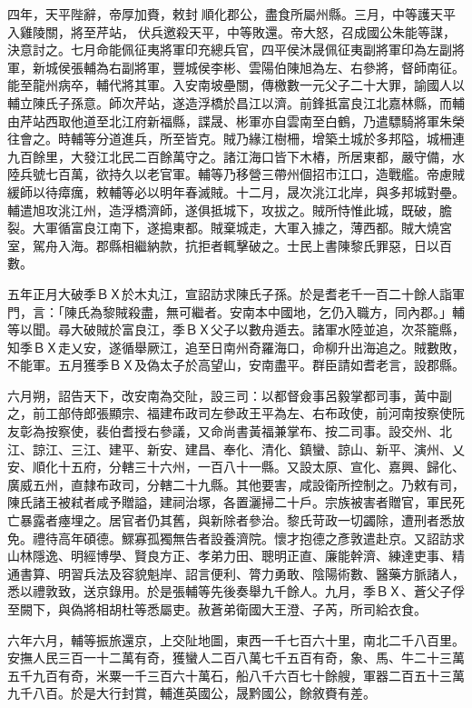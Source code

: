 \begin{pinyinscope}
四年，天平陛辭，帝厚加賚，敕封順化郡公，盡食所屬州縣。三月，中等護天平入雞陵關，將至芹站，伏兵邀殺天平，中等敗還。帝大怒，召成國公朱能等謀，決意討之。七月命能佩征夷將軍印充總兵官，四平侯沐晟佩征夷副將軍印為左副將軍，新城侯張輔為右副將軍，豐城侯李彬、雲陽伯陳旭為左、右參將，督師南征。能至龍州病卒，輔代將其軍。入安南坡壘關，傳檄數一元父子二十大罪，諭國人以輔立陳氏子孫意。師次芹站，遂造浮橋於昌江以濟。前鋒抵富良江北嘉林縣，而輔由芹站西取他道至北江府新福縣，諜晟、彬軍亦自雲南至白鶴，乃遣驃騎將軍朱榮往會之。時輔等分道進兵，所至皆克。賊乃緣江樹柵，增築土城於多邦隘，城柵連九百餘里，大發江北民二百餘萬守之。諸江海口皆下木樁，所居東都，嚴守備，水陸兵號七百萬，欲持久以老官軍。輔等乃移營三帶州個招市江口，造戰艦。帝慮賊緩師以待瘴癘，敕輔等必以明年春滅賊。十二月，晟次洮江北岸，與多邦城對壘。輔遣旭攻洮江州，造浮橋濟師，遂俱抵城下，攻拔之。賊所恃惟此城，既破，膽裂。大軍循富良江南下，遂搗東都。賊棄城走，大軍入據之，薄西都。賊大燒宮室，駕舟入海。郡縣相繼納款，抗拒者輒擊破之。士民上書陳黎氏罪惡，日以百數。

五年正月大破季ＢＸ於木丸江，宣詔訪求陳氏子孫。於是耆老千一百二十餘人詣軍門，言：「陳氏為黎賊殺盡，無可繼者。安南本中國地，乞仍入職方，同內郡。」輔等以聞。尋大破賊於富良江，季ＢＸ父子以數舟遁去。諸軍水陸並追，次茶籠縣，知季ＢＸ走乂安，遂循舉厥江，追至日南州奇羅海口，命柳升出海追之。賊數敗，不能軍。五月獲季ＢＸ及偽太子於高望山，安南盡平。群臣請如耆老言，設郡縣。

六月朔，詔告天下，改安南為交阯，設三司：以都督僉事呂毅掌都司事，黃中副之，前工部侍郎張顯宗、福建布政司左參政王平為左、右布政使，前河南按察使阮友彰為按察使，裴伯耆授右參議，又命尚書黃福兼掌布、按二司事。設交州、北江、諒江、三江、建平、新安、建昌、奉化、清化、鎮蠻、諒山、新平、演州、乂安、順化十五府，分轄三十六州，一百八十一縣。又設太原、宣化、嘉興、歸化、廣威五州，直隸布政司，分轄二十九縣。其他要害，咸設衛所控制之。乃敕有司，陳氏諸王被弒者咸予贈謚，建祠治塚，各置灑掃二十戶。宗族被害者贈官，軍民死亡暴露者瘞埋之。居官者仍其舊，與新除者參治。黎氏苛政一切蠲除，遭刑者悉放免。禮待高年碩德。鰥寡孤獨無告者設養濟院。懷才抱德之彥敦遣赴京。又詔訪求山林隱逸、明經博學、賢良方正、孝弟力田、聰明正直、廉能幹濟、練達吏事、精通書算、明習兵法及容貌魁岸、詔言便利、膂力勇敢、陰陽術數、醫藥方脈諸人，悉以禮敦致，送京錄用。於是張輔等先後奏舉九千餘人。九月，季ＢＸ、蒼父子俘至闕下，與偽將相胡杜等悉屬吏。赦蒼弟衛國大王澄、子芮，所司給衣食。

六年六月，輔等振旅還京，上交阯地圖，東西一千七百六十里，南北二千八百里。安撫人民三百一十二萬有奇，獲蠻人二百八萬七千五百有奇，象、馬、牛二十三萬五千九百有奇，米粟一千三百六十萬石，船八千六百七十餘艘，軍器二百五十三萬九千八百。於是大行封賞，輔進英國公，晟黔國公，餘敘賚有差。


\end{pinyinscope}
